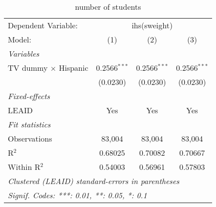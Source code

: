 \begin{table}[htbp]
\centering
\caption{number of students}
\begin{tabular}{lccc}
\tabularnewline\midrule\midrule
Dependent Variable:&\multicolumn{3}{c}{ihs(sweight)}\\
Model:&(1) & (2) & (3)\\
\midrule \emph{Variables}&   &   &  \\
TV dummy $\times$ Hispanic & 0.2566$^{***}$ & 0.2566$^{***}$ & 0.2566$^{***}$\\
  &(0.0230) & (0.0230) & (0.0230)\\
\midrule \emph{Fixed-effects}&   &   &  \\
LEAID & Yes & Yes & Yes\\
\midrule \emph{Fit statistics}&  & & \\
Observations & 83,004&83,004&83,004\\
R$^2$ & 0.68025&0.70082&0.70667\\
Within R$^2$ & 0.54003&0.56961&0.57803\\
\midrule\midrule\multicolumn{4}{l}{\emph{Clustered (LEAID) standard-errors in parentheses}}\\
\multicolumn{4}{l}{\emph{Signif. Codes: ***: 0.01, **: 0.05, *: 0.1}}\\
\end{tabular}
\end{table}

